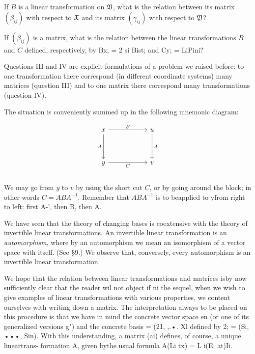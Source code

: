\begin{question}
    If \(B\) is a linear transformation on \(\mathfrak{V}\), what is the relation between its matrix \((\beta_{ij})\) with respect to \(\frak{X}\) and its matrix \((\gamma_{ij})\) with respect to \(\frak{Y}\)?
\end{question}

\begin{question}
    If \((\beta_{ij})\) is a matrix, what is the relation between the linear transformations \(B\) and \(C\) defined, respectively, by Bx; = 2 si Bist; and Cy; = LiPini?
\end{question}

Questions III and IV are explicit formulations of a problem we raised before: to
one transformation there correspond (in different coordinate systems) many
matrices (question III) and to one matrix there correspond many transformations
(question IV).

The situation is conveniently summed up in the following mnemonic
diagram:

\begin{equation*}
    \begin{tikzcd}
        x \arrow[rr, "B"] \arrow[dd, "A"'] &                                                         & u \arrow[dd, "A"] \\
                                           &                                                         &                   \\
        y \arrow[rr, "C"']                 & {} \arrow[phantom, loop, distance=2em, in=305, out=235] & v                
        \end{tikzcd}
\end{equation*}
We may go from \(y\) to \(v\) by using the short cut \(C\), or by going around the block; in other words \(C = ABA^{-1}\). Remember that \({ABA^{-1}}\) is to beapplied to yfrom right to left: first A-', then B, then A.

We have seen that the theory of changing bases is coextensive with the theory of
invertible linear transformations. An invertible linear transformation is an
\emph{automorphism}, where by an automorphism we mean an isomorphism of a vector
space with itself. (See §9.) We observe that, conversely, every automorphism is
an invertible linear transformation.

We hope that the relation between linear transformations and matrices isby now
sufficiently clear that the reader wil not object if ni the sequel, when we wish
to give examples of linear transformations with various properties, we content
ourselves with writing down a matrix. The interpretation always to be placed on
this procedure is that we have in mind the concrete vector space en (or one of
its generalized versions g") and the concrete basis = (21, ,.•. Xl defined by 2;
= (Si, •••, Sin). With this understanding, a matrix (ai) defines, of course, a
unique lineartrans- formation A, given bythe usual formula A(Li tx) = L i(E;
at)Ii.



